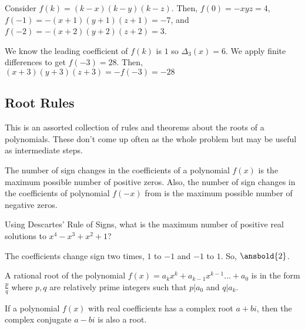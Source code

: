 \documentclass[mast]{lucky}
\begin{document}
\begin{sol}
Consider $f(k)=(k-x)(k-y)(k-z)$. Then, $f(0)=-xyz=4$, $f(-1)=-(x+1)(y+1)(z+1)=-7$, and $f(-2)=-(x+2)(y+2)(z+2)=3$.

We know the leading coefficient of $f(k)$ is $1$ so $\Delta_{3}(x)=6$. We apply finite differences to get $f(-3)=28$. Then, $(x+3)(y+3)(z+3)=-f(-3)=\boxed{-28}$
\end{sol}
\subsection{Root Rules}
This is an assorted collection of rules and theorems about the roots of a polynomials. These don't come up often as the whole problem but may be useful as intermediate steps. 
\begin{theo}
The number of sign changes in the coefficients of a polynomial $f(x)$ is the maximum possible number of positive zeros. Also, the number of sign changes in the coefficients of polynomial $f(-x)$ from is the maximum possible number of negative zeros.
\end{theo}

\begin{exam}
Using Descartes' Rule of Signs, what is the maximum number of positive real solutions to $x^4-x^3+x^2+1$?
\end{exam}

\begin{sol}
The coefficients change sign two times, $1$ to $-1$ and $-1$ to $1$. So, $\ansbold{2}$.
\end{sol}

\begin{theo}
A rational root of the polynomial $f(x)=a_{k}x^{k}+a_{k-1}x^{k-1}\ldots + a_{0}$ is in the form $\frac{p}{q}$ where $p,q$ are relatively prime integers such that $p|a_{0}$ and $q|a_{k}$.
\end{theo}

\begin{theo}
If a polynomial $f(x)$ with real coefficients has a complex root $a+bi$, then the complex conjugate $a-bi$ is also a root.
\end{theo}
\end{document}
